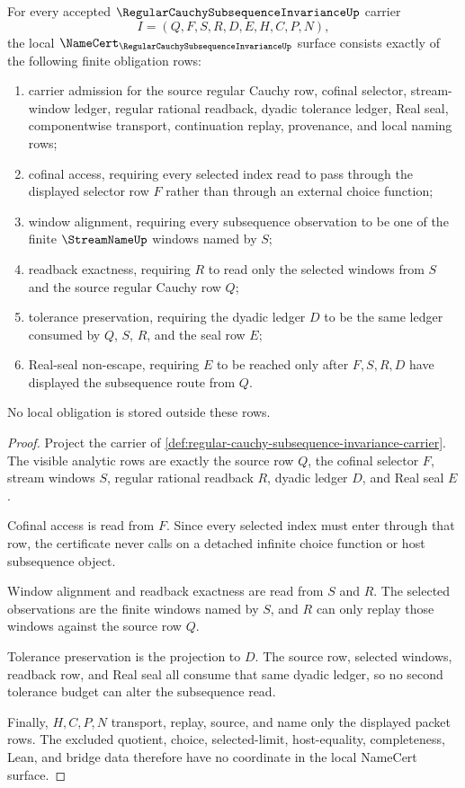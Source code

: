 \begin{theorem}
\label{thm:regular-cauchy-subsequence-invariance-namecert-obligations}
For every accepted $\RegularCauchySubsequenceInvarianceUp$ carrier
$$
I=(Q,F,S,R,D,E,H,C,P,N),
$$
the local $\NameCert_{\RegularCauchySubsequenceInvarianceUp}$ surface consists exactly of the following finite obligation rows:
\begin{enumerate}
\item carrier admission for the source regular Cauchy row, cofinal selector, stream-window ledger, regular rational readback, dyadic tolerance ledger, Real seal, componentwise transport, continuation replay, provenance, and local naming rows;
\item cofinal access, requiring every selected index read to pass through the displayed selector row $F$ rather than through an external choice function;
\item window alignment, requiring every subsequence observation to be one of the finite $\StreamNameUp$ windows named by $S$;
\item readback exactness, requiring $R$ to read only the selected windows from $S$ and the source regular Cauchy row $Q$;
\item tolerance preservation, requiring the dyadic ledger $D$ to be the same ledger consumed by $Q$, $S$, $R$, and the seal row $E$;
\item Real-seal non-escape, requiring $E$ to be reached only after $F,S,R,D$ have displayed the subsequence route from $Q$.
\end{enumerate}
No local obligation is stored outside these rows.
\end{theorem}
\begin{proof}
Project the carrier of \autoref{def:regular-cauchy-subsequence-invariance-carrier}. The visible analytic rows are exactly the source row $Q$, the cofinal selector $F$, stream windows $S$, regular rational readback $R$, dyadic ledger $D$, and Real seal $E$.

Cofinal access is read from $F$. Since every selected index must enter through that row, the certificate never calls on a detached infinite choice function or host subsequence object.

Window alignment and readback exactness are read from $S$ and $R$. The selected observations are the finite windows named by $S$, and $R$ can only replay those windows against the source row $Q$.

Tolerance preservation is the projection to $D$. The source row, selected windows, readback row, and Real seal all consume that same dyadic ledger, so no second tolerance budget can alter the subsequence read.

Finally, $H,C,P,N$ transport, replay, source, and name only the displayed packet rows. The excluded quotient, choice, selected-limit, host-equality, completeness, Lean, and bridge data therefore have no coordinate in the local NameCert surface.
\end{proof}

